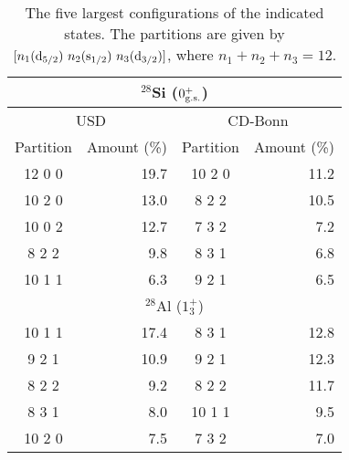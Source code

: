 \begin{table}
\caption{The five largest configurations of the indicated states. The partitions
are given by $[n_1({\rm d}_{5/2})\ n_2({\rm s}_{1/2})\ n_3({\rm d}_{3/2})]$,
where $n_1+n_2+n_3=12$.}
\begin{tabular}{crcr}
\multicolumn{4}{c}{$^{28}$Si ($0^+_{\rm g.s.}$)} \\
\hline
\multicolumn{2}{c}{USD} & \multicolumn{2}{c}{CD-Bonn} \\
Partition & Amount (\%) & Partition & Amount (\%)\\
\hline
12 0 0 & 19.7 & 10 2 0 & 11.2 \\
10 2 0 & 13.0 & 8 2 2 & 10.5 \\
10 0 2 & 12.7 & 7 3 2 & 7.2 \\
8 2 2  & 9.8 & 8 3 1 & 6.8 \\
10 1 1 & 6.3 & 9 2 1 & 6.5 \\
\hline
\multicolumn{4}{c}{$^{28}$Al ($1^+_3$)} \\
\hline
10 1 1 & 17.4 & 8 3 1 & 12.8 \\
9 2 1 & 10.9 & 9 2 1 & 12.3 \\
8 2 2 & 9.2 & 8 2 2 & 11.7 \\
8 3 1 & 8.0 & 10 1 1 & 9.5 \\
10 2 0 & 7.5 & 7 3 2 & 7.0 \\
\hline
\end{tabular}
\label{occ}
\end{table}



